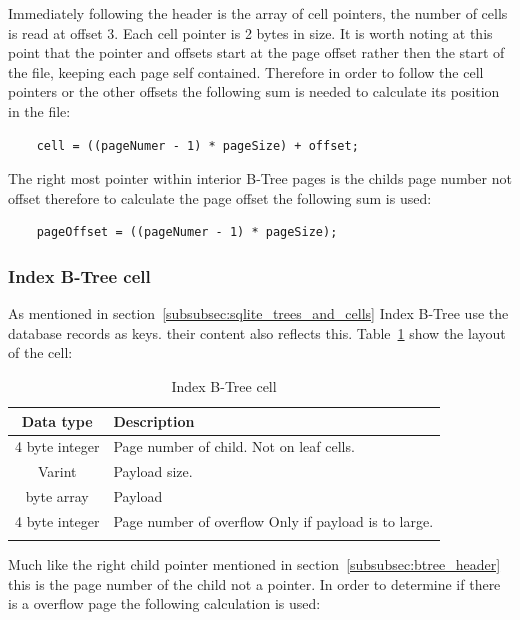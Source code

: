 Immediately following the header is the array of cell pointers, the number of cells is read at offset 3. Each cell pointer is 2 bytes in size. It is worth noting at this point that the pointer and offsets start at the page offset rather then the start of the file, keeping each page self contained. Therefore in order to follow the cell pointers or the other offsets the following sum is needed to calculate its position in the file: 

\begin{lstlisting}	
	cell = ((pageNumer - 1) * pageSize) + offset;
\end{lstlisting}

The right most pointer within interior B-Tree pages is the childs page number not offset therefore to calculate the page offset the following sum is used:

\begin{lstlisting}	
	pageOffset = ((pageNumer - 1) * pageSize);
\end{lstlisting}

\subsubsection{Index B-Tree cell}
\label{subsubsec:index_btree_cell}

As mentioned in section~\ref{subsubsec:sqlite_trees_and_cells} Index B-Tree use the database records as keys. their content also reflects this. Table~\ref{tbl:index_btree_cell} show the layout of the cell:

\begin{longtable}[h]{| c | p{5cm} |}
		\hline
			\textbf{Data type} & \textbf{Description} \\ 
		\hline
		\endhead
			4 byte integer & Page number of child. \newline 
							 Not on leaf cells.\\
		\hline
			Varint & Payload size. \\
		\hline
			byte array & Payload \\
		\hline
			4 byte integer & Page number of overflow \newline
							  Only if payload is to large.\\
		\hline
	\caption{Index B-Tree cell}
	\label{tbl:index_btree_cell}
\end{longtable}

Much like the right child pointer mentioned in section~\ref{subsubsec:btree_header} this is the page number of the child not a pointer. In order to determine if there is a overflow page the following calculation is used:

